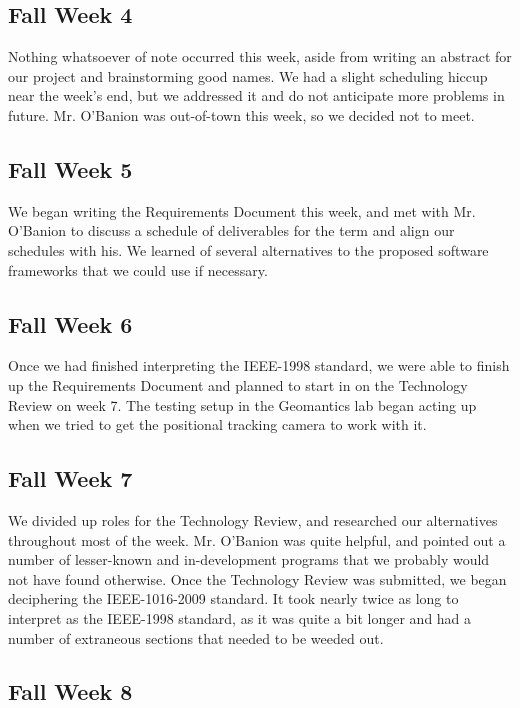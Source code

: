 \documentclass[draftclsnofoot,onecolumn]{IEEEtran}
\begin{document}
\subsection{Fall Week 4}

Nothing whatsoever of note occurred this week, aside from writing an abstract for our project and brainstorming good names. 
We had a slight scheduling hiccup near the week's end, but we addressed it and do not anticipate more problems in future. 
Mr. O'Banion was out-of-town this week, so we decided not to meet.

\subsection{Fall Week 5}

We began writing the Requirements Document this week, and met with Mr. O'Banion to discuss a schedule of deliverables for the term and align our schedules with his. 
We learned of several alternatives to the proposed software frameworks that we could use if necessary.

\subsection{Fall Week 6}

Once we had finished interpreting the IEEE-1998 standard, we were able to finish up the Requirements Document and planned to start in on the Technology Review on week 7. 
The testing setup in the Geomantics lab began acting up when we tried to get the positional tracking camera to work with it.

\subsection{Fall Week 7}

We divided up roles for the Technology Review, and researched our alternatives throughout most of the week. 
Mr. O'Banion was quite helpful, and pointed out a number of lesser-known and in-development programs that we probably would not have found otherwise. 
Once the Technology Review was submitted, we began deciphering the IEEE-1016-2009 standard. 
It took nearly twice as long to interpret as the IEEE-1998 standard, as it was quite a bit longer and had a number of extraneous sections that needed to be weeded out. 

\subsection{Fall Week 8}
\end{document}
